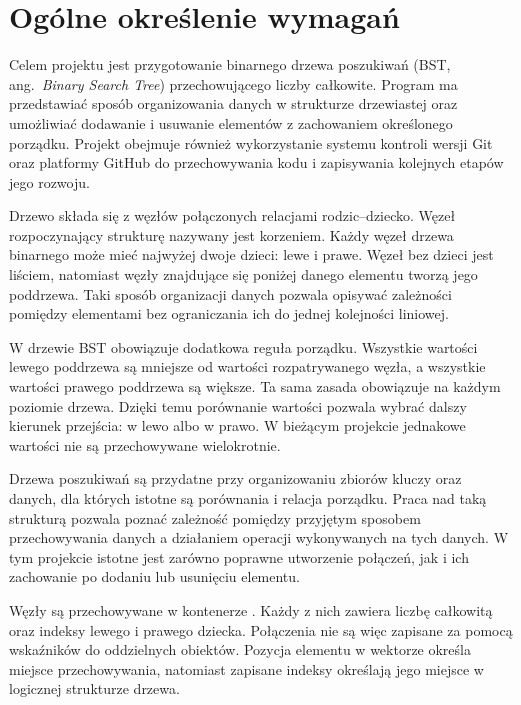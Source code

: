\clearpage
\section{Ogólne określenie wymagań}

Celem projektu jest przygotowanie binarnego drzewa poszukiwań
(BST, ang.~\emph{Binary Search Tree}) przechowującego liczby całkowite.
Program ma przedstawiać sposób organizowania danych w strukturze
drzewiastej oraz umożliwiać dodawanie i usuwanie elementów
z zachowaniem określonego porządku. Projekt obejmuje również
wykorzystanie systemu kontroli wersji Git oraz platformy GitHub
do przechowywania kodu i zapisywania kolejnych etapów jego rozwoju.

Drzewo składa się z węzłów połączonych relacjami rodzic--dziecko.
Węzeł rozpoczynający strukturę nazywany jest korzeniem.
Każdy węzeł drzewa binarnego może mieć najwyżej dwoje dzieci:
lewe i prawe. Węzeł bez dzieci jest liściem, natomiast węzły
znajdujące się poniżej danego elementu tworzą jego poddrzewa.
Taki sposób organizacji danych pozwala opisywać zależności
pomiędzy elementami bez ograniczania ich do jednej kolejności liniowej.

W drzewie BST obowiązuje dodatkowa reguła porządku.
Wszystkie wartości lewego poddrzewa są mniejsze od wartości
rozpatrywanego węzła, a wszystkie wartości prawego poddrzewa
są większe. Ta sama zasada obowiązuje na każdym poziomie drzewa.
Dzięki temu porównanie wartości pozwala wybrać dalszy kierunek
przejścia: w lewo albo w prawo. W bieżącym projekcie jednakowe
wartości nie są przechowywane wielokrotnie.

Drzewa poszukiwań są przydatne przy organizowaniu zbiorów kluczy
oraz danych, dla których istotne są porównania i relacja porządku.
Praca nad taką strukturą pozwala poznać zależność pomiędzy
przyjętym sposobem przechowywania danych a działaniem operacji
wykonywanych na tych danych. W tym projekcie istotne jest
zarówno poprawne utworzenie połączeń, jak i ich zachowanie
po dodaniu lub usunięciu elementu.

Węzły są przechowywane w kontenerze .
Każdy z nich zawiera liczbę całkowitą oraz indeksy lewego
i prawego dziecka. Połączenia nie są więc zapisane za pomocą
wskaźników do oddzielnych obiektów. Pozycja elementu w wektorze
określa miejsce przechowywania, natomiast zapisane indeksy
określają jego miejsce w logicznej strukturze drzewa.

